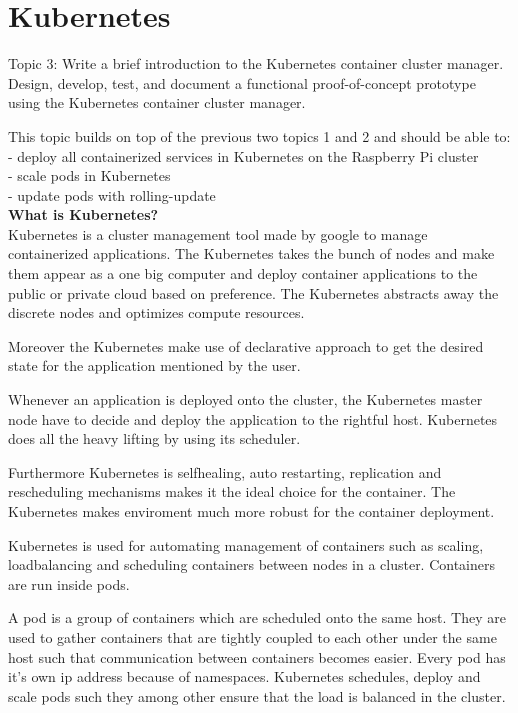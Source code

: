\chapter{Kubernetes}\label{ch:kubernetes}
Topic 3: Write a brief introduction to the Kubernetes container cluster manager. 
Design, develop, test, and document a functional proof-of-concept prototype using the Kubernetes container cluster manager. 

This topic builds on top of the previous two topics 1 and 2 and should be able to:\\
- deploy all containerized services in Kubernetes on the Raspberry Pi cluster \\
- scale pods in Kubernetes \\
- update pods with rolling-update \\

\textbf{What is Kubernetes?}\\

Kubernetes is a cluster management tool made by google to manage containerized applications. The Kubernetes takes the bunch of nodes and make them appear as a one big computer and deploy container applications to the public or private cloud based on preference. The Kubernetes abstracts away the discrete nodes and optimizes compute resources.  

Moreover the Kubernetes make use of declarative approach to get the desired state for the application mentioned by the user. 

Whenever an application is deployed onto the cluster, the Kubernetes master node have to decide and deploy the application to the rightful host. Kubernetes does all the heavy lifting by using its scheduler. 

Furthermore Kubernetes is selfhealing, auto restarting, replication and rescheduling mechanisms makes it the ideal choice for the container. The Kubernetes makes enviroment much more robust for the container deployment. 


Kubernetes is used for automating management of containers such as scaling, loadbalancing and scheduling containers between nodes in a cluster. Containers are run inside pods.

A pod is a group of containers which are scheduled onto the same host. They are used to gather containers that are tightly coupled to each other under the same host such that communication between containers becomes easier. Every pod has it's own ip address because of namespaces. Kubernetes schedules, deploy and scale pods such they among other ensure that the load is balanced in the cluster. 

